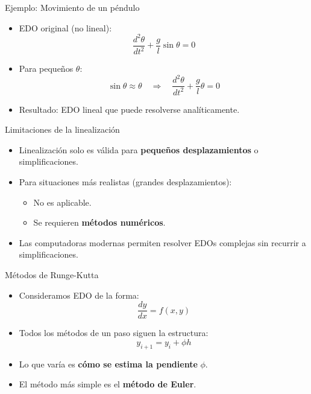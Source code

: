 \documentclass[main.tex]{subfiles}
\begin{document}
\begin{frame}{\small Ejemplo: Movimiento de un p\'endulo}
\begin{itemize}
  \item EDO original (no lineal):
  \[
    \frac{d^2\theta}{dt^2} + \frac{g}{l} \sin\theta = 0
  \]
  \item Para peque\~nos \( \theta \):
  \[
    \sin\theta \approx \theta \quad \Rightarrow \quad \frac{d^2\theta}{dt^2} + \frac{g}{l} \theta = 0
  \]
  \item Resultado: EDO lineal que puede resolverse anal\'iticamente.
\end{itemize}
\end{frame}

\begin{frame}{\small Limitaciones de la linealizaci\'on}
\begin{itemize}
  \item Linealizaci\'on solo es v\'alida para \textbf{peque\~nos desplazamientos} o simplificaciones.
  \item Para situaciones m\'as realistas (grandes desplazamientos):
  \begin{itemize}
    \item No es aplicable.
    \item Se requieren \textbf{m\'etodos num\'ericos}.
  \end{itemize}
  \item Las computadoras modernas permiten resolver EDOs complejas sin recurrir a simplificaciones.
\end{itemize}
\end{frame}

\begin{frame}{\small M\'etodos de Runge-Kutta}
\begin{itemize}
  \item Consideramos EDO de la forma:
  \[
    \frac{dy}{dx} = f(x, y)
  \]
  \item Todos los m\'etodos de un paso siguen la estructura:
  \[
    y_{i+1} = y_i + \phi h
  \]
  \item Lo que var\'ia es \textbf{c\'omo se estima la pendiente} $\phi$.
  \item El m\'etodo m\'as simple es el \textbf{m\'etodo de Euler}.
\end{itemize}
\end{frame}
\end{document}
